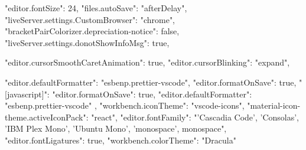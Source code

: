 {
  "editor.fontSize": 24,
  "files.autoSave": "afterDelay",
  "liveServer.settings.CustomBrowser": "chrome",
  "bracketPairColorizer.depreciation-notice": false,
  "liveServer.settings.donotShowInfoMsg": true,

  "editor.cursorSmoothCaretAnimation": true,
  "editor.cursorBlinking": "expand",

  "editor.defaultFormatter": "esbenp.prettier-vscode",
  "editor.formatOnSave": true,
  "[javascript]": {
    "editor.formatOnSave": true,
    "editor.defaultFormatter": "esbenp.prettier-vscode"
  },
  "workbench.iconTheme": "vscode-icons",
  "material-icon-theme.activeIconPack": "react",
  "editor.fontFamily": "'Cascadia Code', 'Consolas', 'IBM Plex Mono', 'Ubuntu Mono', 'monospace', monospace",
  "editor.fontLigatures": true,
  "workbench.colorTheme": "Dracula"
}
